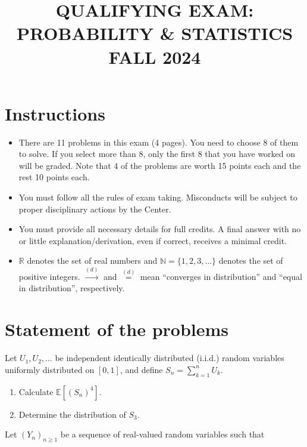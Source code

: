 \documentclass[11pt,a4paper]{article}
\title{\textbf{QUALIFYING EXAM: PROBABILITY \& STATISTICS}\\[0.5em]\Large FALL 2024}
\date{}
\author{}
\newcommand{\examstatement}[1]{%
  \par\addvspace{0.85em}%
  \noindent{\bfseries #1}\par\nobreak\addvspace{0.28em}%
}
\begin{document}
\maketitle
\vspace{-3em}

\tableofcontents

\section{Instructions}
\begin{itemize}
    \item There are 11 problems in this exam (4 pages). You need to choose 8 of them to solve. If you select more than 8, only the first 8 that you have worked on will be graded. Note that 4 of the problems are worth 15 points each and the rest 10 points each.
    \item You must follow all the rules of exam taking. Misconducts will be subject to proper disciplinary actions by the Center.
    \item You must provide all necessary details for full credits. A final answer with no or little explanation/derivation, even if correct, receives a minimal credit.
    \item \( \mathbb{R} \) denotes the set of real numbers and \( \mathbb{N} = \{1, 2, 3, \dots\} \) denotes the set of positive integers. \( \xrightarrow{(d)} \) and \( \stackrel{(d)}{=} \) mean ``converges in distribution'' and ``equal in distribution'', respectively.
\end{itemize}

\section{Statement of the problems}

\examstatement{Problem 1. [10 pts.]}
Let \( U_1, U_2, \dots \) be independent identically distributed (i.i.d.) random variables uniformly distributed on \( [0, 1] \), and define \( S_n = \sum_{k=1}^n U_k \).
\begin{enumerate}[label=(\alph*)]
    \item Calculate \( \mathbb{E}[(S_n)^4] \).
    \item Determine the distribution of \( S_3 \).
\end{enumerate}

\examstatement{Problem 2. [10 pts.]}
Let \( (Y_n)_{n \ge 1} \) be a sequence of real-valued random variables such that
\end{document}
